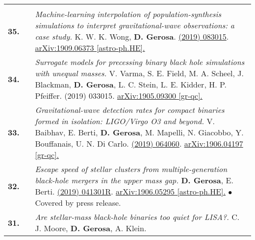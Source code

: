 {\begin{longtable}{rp{0.3cm}p{15.8cm}}
\vspace{0.09cm}\\
%
\textbf{35.} & & \textit{Machine-learning interpolation of population-synthesis simulations to interpret gravitational-wave observations: a case study.}
\newline{}
K. W. K. Wong, \textbf{D. Gerosa}.
\newline{}
\href{https://journals.aps.org/prd/abstract/10.1103/PhysRevD.100.083015}{\prd 100 (2019) 083015}. \href{https://arxiv.org/abs/1909.06373}{arXiv:1909.06373 [astro-ph.HE].}
\vspace{0.09cm}\\
%
\textbf{34.} & & \textit{Surrogate models for precessing binary black hole simulations with unequal masses.}
\newline{}
V. Varma, S. E. Field, M. A. Scheel, J. Blackman, \textbf{D. Gerosa}, L. C. Stein, L. E. Kidder, H. P. Pfeiffer.
\newline{}
{\prr 1 (2019) 033015}. \href{https://arxiv.org/abs/1905.09300}{arXiv:1905.09300 [gr-qc].}
\vspace{0.09cm}\\
%
\textbf{33.} & & \textit{Gravitational-wave detection rates for compact binaries formed in isolation: LIGO/Virgo O3 and beyond.}
\newline{}
V. Baibhav, E. Berti, \textbf{D. Gerosa}, M. Mapelli, N. Giacobbo, Y. Bouffanais, U. N. Di Carlo.
\newline{}
\href{https://journals.aps.org/prd/abstract/10.1103/PhysRevD.100.064060}{\prd 100 (2019) 064060}. \href{https://arxiv.org/abs/1906.04197}{arXiv:1906.04197 [gr-qc].}
\vspace{0.09cm}\\
%
\textbf{32.} & & \textit{Escape speed of stellar clusters from multiple-generation black-hole mergers in the upper mass gap.}
\newline{}
\textbf{D. Gerosa}, E. Berti.
\newline{}
\href{https://journals.aps.org/prd/abstract/10.1103/PhysRevD.100.041301}{\prdrc 100 (2019) 041301R}. \href{https://arxiv.org/abs/1906.05295}{arXiv:1906.05295 [astro-ph.HE].}
\newline{}
\textcolor{color1}{$\bullet$} Covered by press release.
\vspace{0.09cm}\\
%
\textbf{31.} & & \textit{Are stellar-mass black-hole binaries too quiet for LISA?.}
\newline{}
C. J. Moore, \textbf{D. Gerosa}, A. Klein.
\newline{}

\end{longtable}}
